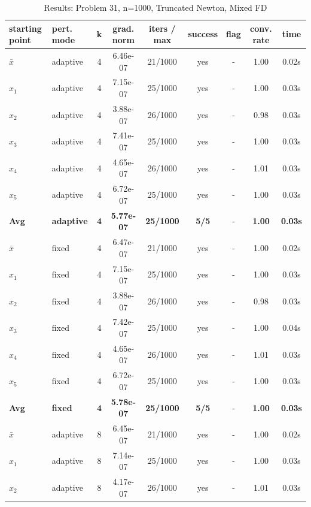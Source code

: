 \begin{longtable}{|l|l|c|c|c|c|c|c|c|}
\caption{Results: Problem 31, n=1000, Truncated Newton, Mixed FD} \\
\hline
\textbf{starting point} & \textbf{pert. mode} & \textbf{k} & \textbf{grad. norm} & \textbf{iters / max} & \textbf{success} & \textbf{flag} & \textbf{conv. rate} & \textbf{time} \\
\hline
\endfirsthead
\endhead
\endfoot
\hline
\endlastfoot
$\bar{x}$ & adaptive & 4 & 6.46e-07 & 21/1000 & yes & - & 1.00 & 0.02s \\
\hline
$x_1$ & adaptive & 4 & 7.15e-07 & 25/1000 & yes & - & 1.00 & 0.03s \\
\hline
$x_2$ & adaptive & 4 & 3.88e-07 & 26/1000 & yes & - & 0.98 & 0.03s \\
\hline
$x_3$ & adaptive & 4 & 7.41e-07 & 25/1000 & yes & - & 1.00 & 0.03s \\
\hline
$x_4$ & adaptive & 4 & 4.65e-07 & 26/1000 & yes & - & 1.01 & 0.03s \\
\hline
$x_5$ & adaptive & 4 & 6.72e-07 & 25/1000 & yes & - & 1.00 & 0.03s \\
\hline
\hline\hline
\textbf{Avg} & \textbf{adaptive} & \textbf{4} & \textbf{5.77e-07} & \textbf{25/1000} & \textbf{5/5} & - & \textbf{1.00} & \textbf{0.03s} \\
\hline\hline
\hline
$\bar{x}$ & fixed & 4 & 6.47e-07 & 21/1000 & yes & - & 1.00 & 0.02s \\
\hline
$x_1$ & fixed & 4 & 7.15e-07 & 25/1000 & yes & - & 1.00 & 0.03s \\
\hline
$x_2$ & fixed & 4 & 3.88e-07 & 26/1000 & yes & - & 0.98 & 0.03s \\
\hline
$x_3$ & fixed & 4 & 7.42e-07 & 25/1000 & yes & - & 1.00 & 0.04s \\
\hline
$x_4$ & fixed & 4 & 4.65e-07 & 26/1000 & yes & - & 1.01 & 0.03s \\
\hline
$x_5$ & fixed & 4 & 6.72e-07 & 25/1000 & yes & - & 1.00 & 0.03s \\
\hline
\hline\hline
\textbf{Avg} & \textbf{fixed} & \textbf{4} & \textbf{5.78e-07} & \textbf{25/1000} & \textbf{5/5} & - & \textbf{1.00} & \textbf{0.03s} \\
\hline\hline
$\bar{x}$ & adaptive & 8 & 6.45e-07 & 21/1000 & yes & - & 1.00 & 0.02s \\
\hline
$x_1$ & adaptive & 8 & 7.14e-07 & 25/1000 & yes & - & 1.00 & 0.03s \\
\hline
$x_2$ & adaptive & 8 & 4.17e-07 & 26/1000 & yes & - & 1.01 & 0.03s \\

\end{longtable}
